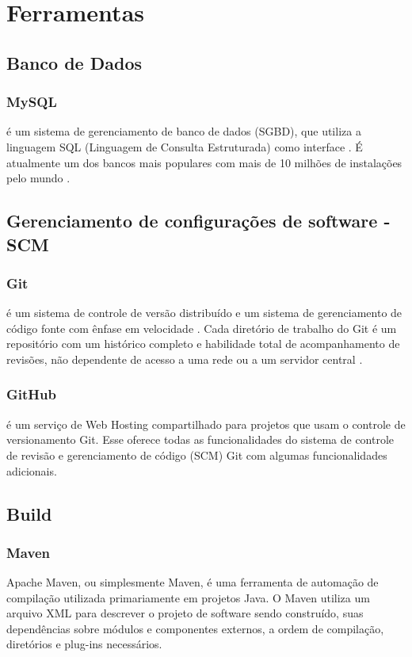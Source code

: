 \chapter{Ferramentas}

    \section{Banco de Dados}

	\subsection{MySQL} é um sistema de gerenciamento de banco de dados (SGBD),
	que utiliza a linguagem SQL (Linguagem de Consulta Estruturada) como
	interface \cite{mysql2001mysql}. É atualmente um dos bancos mais populares com mais de 10
	milhões de instalações pelo mundo \cite{delisle2006creating}.

    \section{Gerenciamento de configurações de software - SCM}

	\subsection{Git} é um sistema de controle de versão distribuído e um
	sistema de gerenciamento de código fonte com ênfase em velocidade \cite{loeliger2012version}.
	Cada diretório de trabalho do Git é um repositório com um histórico
	completo e habilidade total de acompanhamento de revisões, não
	dependente de acesso a uma rede ou a um servidor central \cite{somasundaram2013git}.

	\subsection{GitHub} é um serviço de Web Hosting compartilhado
	para projetos que usam o controle de versionamento Git.
	Esse oferece todas as funcionalidades do sistema de controle de
	revisão e gerenciamento de código (SCM) Git com algumas
	funcionalidades adicionais.

    \section{Build}

	\subsection{Maven} Apache Maven, ou simplesmente Maven, é uma
	ferramenta de automação de compilação utilizada primariamente
	em projetos Java. O Maven utiliza um arquivo XML para descrever
	o projeto de software sendo construído, suas dependências sobre
	módulos e componentes externos, a ordem de compilação,
	diretórios e plug-ins necessários.


